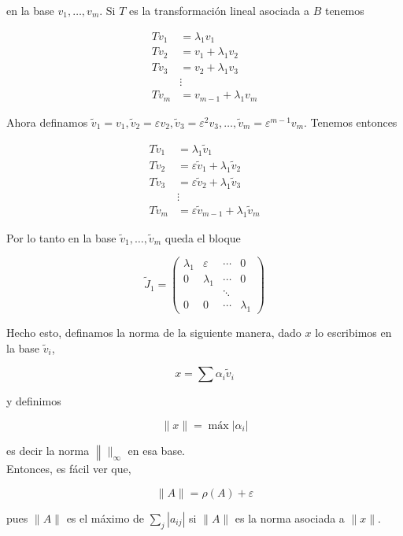 \documentclass[10pt]{article}
\begin{document}
en la base $v_{1}, \ldots, v_{m}$. Si $T$ es la transformación lineal asociada a $B$ tenemos

$$
\begin{aligned}
T v_{1} & =\lambda_{1} v_{1} \\
T v_{2} & =v_{1}+\lambda_{1} v_{2} \\
T v_{3} & =v_{2}+\lambda_{1} v_{3} \\
& \vdots \\
T v_{m} & =v_{m-1}+\lambda_{1} v_{m}
\end{aligned}
$$

Ahora definamos $\tilde{v}_{1}=v_{1}, \tilde{v}_{2}=\varepsilon v_{2}, \tilde{v}_{3}=\varepsilon^{2} v_{3}, \ldots, \tilde{v}_{m}=\varepsilon^{m-1} v_{m}$. Tenemos entonces

$$
\begin{aligned}
T \tilde{v}_{1} & =\lambda_{1} \tilde{v}_{1} \\
T \tilde{v}_{2} & =\varepsilon \tilde{v}_{1}+\lambda_{1} \tilde{v}_{2} \\
T \tilde{v}_{3} & =\varepsilon \tilde{v}_{2}+\lambda_{1} \tilde{v}_{3} \\
& \vdots \\
T \tilde{v}_{m} & =\varepsilon \tilde{v}_{m-1}+\lambda_{1} \tilde{v}_{m}
\end{aligned}
$$

Por lo tanto en la base $\tilde{v}_{1}, \ldots, \tilde{v}_{m}$ queda el bloque

$$
\tilde{J}_{1}=\left(\begin{array}{cccc}
\lambda_{1} & \varepsilon & \cdots & 0 \\
0 & \lambda_{1} & \cdots & 0 \\
& & \ddots & \\
0 & 0 & \cdots & \lambda_{1}
\end{array}\right)
$$

Hecho esto, definamos la norma de la siguiente manera, dado $x$ lo escribimos en la base $\tilde{v}_{i}$,

$$
x=\sum \alpha_{i} \tilde{v}_{i}
$$

y definimos

$$
\|x\|=\operatorname{máx}\left|\alpha_{i}\right|
$$

es decir la norma $\left\|\|_{\infty}\right.$ en esa base.\\
Entonces, es fácil ver que,

$$
\|A\|=\rho(A)+\varepsilon
$$

pues $\|A\|$ es el máximo de $\sum_{j}\left|a_{i j}\right|$ si $\|A\|$ es la norma asociada a $\|x\|$.
\end{document}
